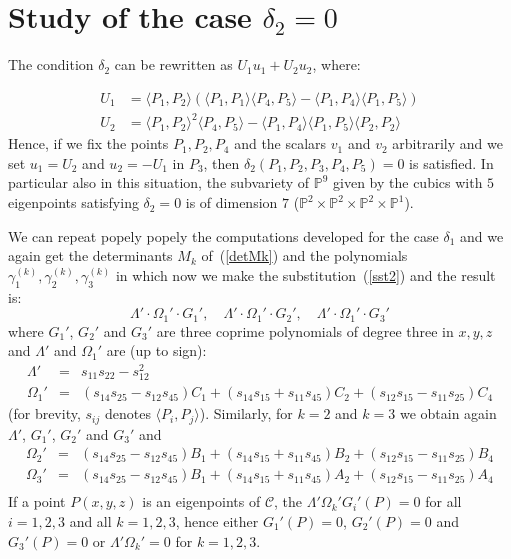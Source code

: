 \documentclass{amsart}
\theoremstyle{plain}
\theoremstyle{definition}
\newcommand{\scl}[2]{\langle #1, #2 \rangle}
\begin{document}
\section{Study of the case  $\delta_2 =0$}

The condition $\delta_2$ can be rewritten as
$U_1u_1+U_2u_2$, where:

\begin{equation}
  \begin{split}
    U_1 & =  \langle P_1, P_2\rangle \left(\langle P_1, P_1\rangle
  \langle P_4,P_5\rangle - \langle P_1, P_4\rangle \langle P_1, P_5\rangle
  \right)\\
  U_2 & =  \langle P_1, P_2\rangle^2\langle P_4, P_5\rangle
  -\langle P_1, P_4\rangle \langle P_1, P_5\rangle \langle P_2, P_2\rangle
  \label{sst2}
  \end{split}
\end{equation}
Hence, if we fix the points $P_1, P_2, P_4$ and the scalars $v_1$ and $v_2$
arbitrarily and we set $u_1 = U_2$ and $u_2 = -U_1$ in $P_3$, then
$\delta_2(P_1, P_2, P_3, P_4, P_5) = 0$ is satisfied.
In particular also in this situation, the subvariety of $\mathbb{P}^9$
given by the cubics with $5$ eigenpoints satisfying $\delta_2=0$
is of dimension $7$
($\mathbb{P}^2 \times \mathbb{P}^2\times \mathbb{P}^2\times \mathbb{P}^1$).

We can repeat popely popely the computations developed for the case $\delta_1$
and we again get the determinants $M_k$ of~(\ref{detMk}) and the polynomials
$\gamma_1^{(k)}, \gamma_2^{(k)}, \gamma_3^{(k)}$ in which now we make the
substitution~(\ref{sst2}) and the result is:
\[
\Lambda'\cdot \Omega_1' \cdot G_1', \quad
\Lambda'\cdot \Omega_1' \cdot G_2', \quad
\Lambda'\cdot \Omega_1' \cdot G_3'
\]
where $G_1'$, $G_2'$ and $G_3'$ are three coprime polynomials of degree three
in $x, y, z$ and $\Lambda'$ and $\Omega_1'$ are (up to sign):
\begin{eqnarray}
  \Lambda' & = & s_{11}s_{22}-s_{12}^2\\
  \Omega_1' & = & (s_{14}s_{25} - s_{12}s_{45})C_1
  + (s_{14}s_{15} + s_{11}s_{45})C_2 + (s_{12}s_{15} - s_{11}s_{25})C_4
\end{eqnarray}
(for brevity,  $s_{ij}$ denotes $\scl{P_i}{P_j}$).
Similarly, for $k = 2$ and $k = 3$ we obtain again $\Lambda'$, $G_1'$,
$G_2'$ and $G_3'$ and
\begin{eqnarray*}
  \Omega_2' & = & (s_{14}s_{25} - s_{12}s_{45})B_1
  + (s_{14}s_{15} + s_{11}s_{45})B_2 + (s_{12}s_{15} - s_{11}s_{25})B_4\\
  \Omega_3' & = & (s_{14}s_{25} - s_{12}s_{45})B_1
  + (s_{14}s_{15} + s_{11}s_{45})A_2 + (s_{12}s_{15} - s_{11}s_{25})A_4\\
\end{eqnarray*}
If a point $P(x, y, z)$ is an eigenpoints of $\mathcal{C}$, the
$\Lambda'\Omega_k'G_i'(P)=0$ for all $i=1, 2, 3$ and all $k = 1, 2, 3$,
hence either $G_1'(P) = 0$, $G_2'(P) = 0$ and $G_3'(P)=0$ or
$\Lambda'\Omega_k' = 0$ for $k = 1, 2, 3$.
\end{document}
